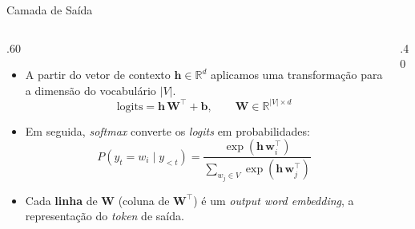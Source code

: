 \documentclass[aspectratio=169,xcolor=dvipsnames]{beamer}
\begin{document}
\begin{frame}{Camada de Saída}
\begin{columns}
    \begin{column}{.60\linewidth}
        \begin{itemize}\small
            \item A partir do vetor de contexto $\mathbf{h} \in \mathbb{R}^d$ aplicamos uma transformação para a dimensão do vocabulário $|V|$.
            \begin{equation*}
                \text{logits} = \mathbf{h}\,\mathbf{W}^{\top} + \mathbf{b}, \qquad \mathbf{W} \in \mathbb{R}^{|V|\times d}
            \end{equation*}
            \item Em seguida, \textit{softmax} converte os \textit{logits} em probabilidades:
            \begin{equation*}
                P(y_t = w_i \mid y_{<t}) = \frac{\exp(\mathbf{h}\,\mathbf{w}_i^{\top})}{\sum_{w_j \in V} \exp(\mathbf{h}\,\mathbf{w}_j^{\top})}
            \end{equation*}
            \item Cada \textbf{linha} de $\mathbf{W}$ (coluna de $\mathbf{W}^{\top}$) é um \textit{output word embedding}, a representação do \textit{token} de saída.
        \end{itemize}
    \end{column}
    \begin{column}{.40\linewidth}
        \centering
\end{column}
\end{columns}
\end{frame}
\end{document}
